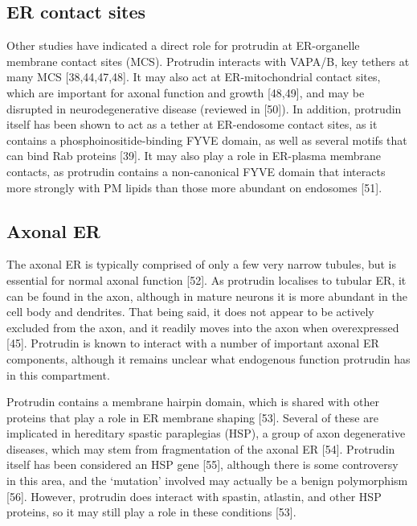 \documentclass[
  12pt,
  a4paper,
]{book}
\begin{document}
\hypertarget{er-contact-sites}{%
\subsection{ER contact sites}\label{er-contact-sites}}

Other studies have indicated a direct role for protrudin at ER-organelle membrane contact sites (MCS). Protrudin interacts with VAPA/B, key tethers at many MCS {[}38,44,47,48{]}. It may also act at ER-mitochondrial contact sites, which are important for axonal function and growth {[}48,49{]}, and may be disrupted in neurodegenerative disease (reviewed in {[}50{]}). In addition, protrudin itself has been shown to act as a tether at ER-endosome contact sites, as it contains a phosphoinositide-binding FYVE domain, as well as several motifs that can bind Rab proteins {[}39{]}. It may also play a role in ER-plasma membrane contacts, as protrudin contains a non-canonical FYVE domain that interacts more strongly with PM lipids than those more abundant on endosomes {[}51{]}.

\hypertarget{intro-ptdn-axonalER}{%
\subsection{Axonal ER}\label{intro-ptdn-axonalER}}

The axonal ER is typically comprised of only a few very narrow tubules, but is essential for normal axonal function {[}52{]}. As protrudin localises to tubular ER, it can be found in the axon, although in mature neurons it is more abundant in the cell body and dendrites. That being said, it does not appear to be actively excluded from the axon, and it readily moves into the axon when overexpressed {[}45{]}. Protrudin is known to interact with a number of important axonal ER components, although it remains unclear what endogenous function protrudin has in this compartment.

Protrudin contains a membrane hairpin domain, which is shared with other proteins that play a role in ER membrane shaping {[}53{]}. Several of these are implicated in hereditary spastic paraplegias (HSP), a group of axon degenerative diseases, which may stem from fragmentation of the axonal ER {[}54{]}. Protrudin itself has been considered an HSP gene {[}55{]}, although there is some controversy in this area, and the `mutation' involved may actually be a benign polymorphism {[}56{]}. However, protrudin does interact with spastin, atlastin, and other HSP proteins, so it may still play a role in these conditions {[}53{]}.
\end{document}
